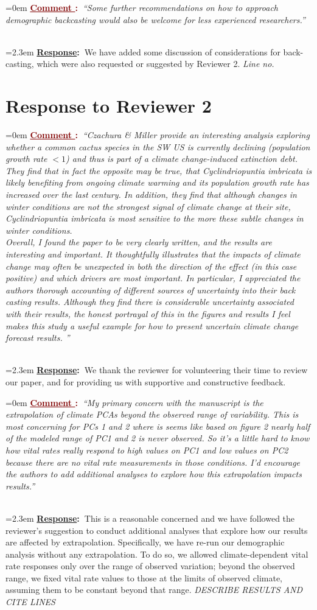 \documentclass[12pt]{article}
\newcounter{cN}
\newcommand{\comment}[1]{
	\vspace{2em}
	\refstepcounter{cN} %
	\noindent \hangindent=0em \textbf{\textcolor{Maroon}{\uline{Comment \thecN}:~}}\emph{``#1''}
	}
\newcommand{\response}[1]{
	\\[0.25em]
	\hangindent=2.3em \textbf{\textcolor{NavyBlue}{\uline{Response}:~}}#1
	}
\begin{document}
\comment{Some further recommendations on how to approach demographic backcasting would also be welcome for less experienced researchers.}
\response{We have added some discussion of considerations for back-casting, which were also requested or suggested by Reviewer 2. \textit{Line no.}}

\section{Response to Reviewer 2}
\vspace{-2em}

\comment{Czachura \& Miller provide an interesting analysis exploring whether a common cactus species in the SW US is currently declining (population growth rate $<1$) and thus is part of a climate change-induced extinction debt. They find that in fact the opposite may be true, that Cyclindriopuntia imbricata is likely benefiting from ongoing climate warming and its population growth rate has increased over the last century. In addition, they find that although changes in winter conditions are not the strongest signal of climate change at their site, Cyclindriopuntia imbricata is most sensitive to the more these subtle changes in winter conditions. 
\\
Overall, I found the paper to be very clearly written, and the results are interesting and important. It thoughtfully illustrates that the impacts of climate change may often be unexpected in both the direction of the effect (in this case positive) and which drivers are most important.  In particular, I appreciated the authors thorough accounting of different sources of uncertainty into their back casting results. Although they find there is considerable uncertainty associated with their results, the honest portrayal of this in the figures and results I feel makes this study a useful example for how to present uncertain climate change forecast results. 
}
\response{We thank the reviewer for volunteering their time to review our paper, and for providing us with supportive and constructive feedback.}

\comment{My primary concern with the manuscript is the extrapolation of climate PCAs beyond the observed range of variability. This is most concerning for PCs 1 and 2 where is seems like based on figure 2 nearly half of the modeled range of PC1 and 2 is never observed. So it’s a little hard to know how vital rates really respond to high values on PC1 and low values on PC2 because there are no vital rate measurements in those conditions. I’d encourage the authors to add additional analyses to explore how this extrapolation impacts results.}
\response{This is a reasonable concerned and we have followed the reviewer's suggestion to conduct additional analyses that explore how our results are affected by extrapolation.
Specifically, we have re-run our demographic analysis without any extrapolation.
To do so, we allowed climate-dependent vital rate responses only over the range of observed variation; beyond the observed range, we fixed vital rate values to those at the limits of observed climate, assuming them to be constant beyond that range.
\textit{DESCRIBE RESULTS AND CITE LINES}}
\end{document}
